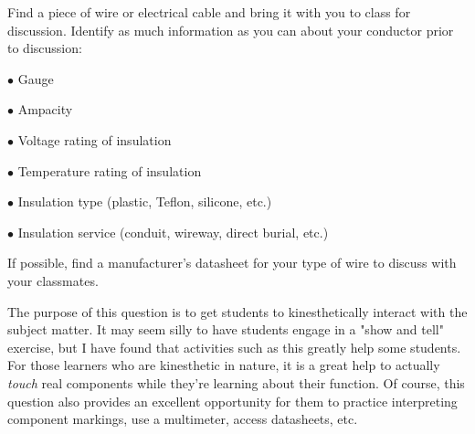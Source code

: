 

Find a piece of wire or electrical cable and bring it with you to class for discussion.  Identify as much information as you can about your conductor prior to discussion:

\medskip
\item{$\bullet$} Gauge
\item{$\bullet$} Ampacity
\item{$\bullet$} Voltage rating of insulation
\item{$\bullet$} Temperature rating of insulation
\item{$\bullet$} Insulation type (plastic, Teflon, silicone, etc.)
\item{$\bullet$} Insulation service (conduit, wireway, direct burial, etc.)
\medskip







If possible, find a manufacturer's datasheet for your type of wire to discuss with your classmates.







The purpose of this question is to get students to kinesthetically interact with the subject matter.  It may seem silly to have students engage in a "show and tell" exercise, but I have found that activities such as this greatly help some students.  For those learners who are kinesthetic in nature, it is a great help to actually {\it touch} real components while they're learning about their function.  Of course, this question also provides an excellent opportunity for them to practice interpreting component markings, use a multimeter, access datasheets, etc.




